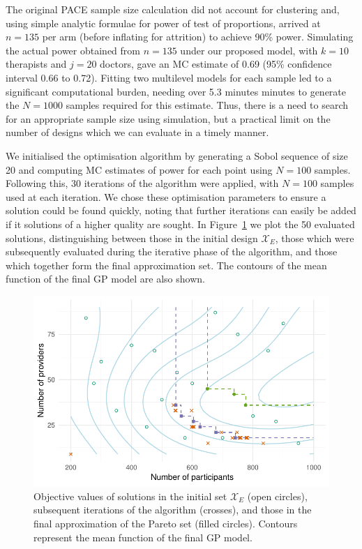 \documentclass{article} %
\begin{document}
The original PACE sample size calculation did not account for clustering and, using simple analytic formulae for power of test of proportions, arrived at $n = 135$ per arm (before inflating for attrition) to achieve 90\% power. Simulating the actual power obtained from $n=135$ under our proposed model, with $k = 10$ therapists and $j = 20$ doctors, gave an MC estimate of 0.69 (95\% confidence interval 0.66 to 0.72). Fitting two multilevel models for each sample led to a significant computational burden, needing over 5.3 minutes minutes to generate the $N=1000$ samples required for this estimate. Thus, there is a need to search for an appropriate sample size using simulation, but a practical limit on the number of designs which we can evaluate in a timely manner. 

We initialised the optimisation algorithm by generating a Sobol sequence of size 20 and computing MC estimates of power for each point using $N = 100$ samples. Following this, 30 iterations of the algorithm were applied, with $N = 100$ samples used at each iteration. We chose these optimisation parameters to ensure a solution could be found quickly, noting that further iterations can easily be added if it solutions of a higher quality are sought. In Figure~\ref{fig:ex1_single_run} we plot the 50 evaluated solutions, distinguishing between those in the initial design $\mathcal{X}_{E}$, those which were subsequently evaluated during the iterative phase of the algorithm, and those which together form the final approximation set. The contours of the mean function of the final GP model are also shown. 

\begin{figure}
\centering
\includegraphics[scale=0.8]{./Figures/ex1_single_run}
\caption{Objective values of solutions in the initial set $\mathcal{X}_{E}$ (open circles), subsequent iterations of the algorithm (crosses), and those in the final approximation of the Pareto set (filled circles). Contours represent the mean function of the final GP model.}
\label{fig:ex1_single_run}
\end{figure}
\end{document}
